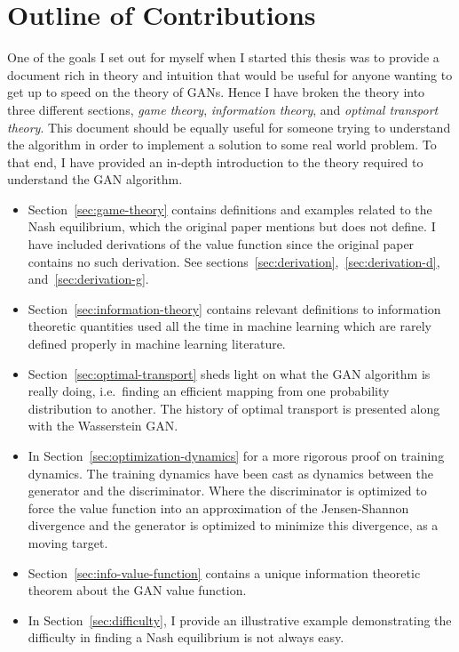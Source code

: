\section*{Outline of Contributions}

One of the goals I set out for myself when I started this thesis was
to provide a document rich in theory and intuition that would be
useful for anyone wanting to get up to speed on the theory of
GANs. Hence I have broken the theory into three different sections,
\textit{game theory}, \textit{information theory}, and \textit{optimal
  transport theory}.  This document should be equally useful for
someone trying to understand the algorithm in order to implement a
solution to some real world problem. To that end, I have provided an
in-depth introduction to the theory required to understand the GAN
algorithm.

\begin{itemize}
\item Section~\ref{sec:game-theory} contains definitions and examples
  related to the Nash equilibrium, which the original paper mentions
  but does not define.  I have included derivations of the value
  function since the original paper contains no such derivation. See
  sections~\ref{sec:derivation},~\ref{sec:derivation-d},
  and~\ref{sec:derivation-g}.
\item Section~\ref{sec:information-theory} contains relevant
  definitions to information theoretic quantities used all the time in
  machine learning which are rarely defined properly in machine
  learning literature.
\item Section~\ref{sec:optimal-transport} sheds light on what the GAN
  algorithm is really doing, i.e.\ finding an efficient mapping from
  one probability distribution to another. The history of optimal
  transport is presented along with the Wasserstein GAN.
  \item In Section~\ref{sec:optimization-dynamics} for a more rigorous
    proof on training dynamics.  The training dynamics have been cast
    as dynamics between the generator and the discriminator.  Where
    the discriminator is optimized to force the value function into an
    approximation of the Jensen-Shannon divergence and the generator
    is optimized to minimize this divergence, as a moving target.
  \item Section~\ref{sec:info-value-function} contains a unique
    information theoretic theorem about the GAN value function.
\item In Section~\ref{sec:difficulty}, I provide an illustrative
  example demonstrating the difficulty in finding a Nash equilibrium
  is not always easy.
\end{itemize}

